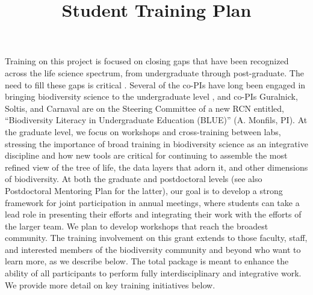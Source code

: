 \documentclass[11pt]{article}
\title{Student Training Plan \vspace{-1.5ex}}
\author{}
\date{}
\begin{document}
\maketitle
\thispagestyle{fancy} 
\vspace{-6em}


Training on this project is focused on closing gaps that have been
recognized across the life science spectrum, from undergraduate
through post-graduate.  The need to fill these gaps is critical
\citep{woodin2010}. Several of the co-PIs have long been engaged in
bringing biodiversity science to the undergraduate level
\citep[e.g.,][]{cook2014, lacey2017}, and co-PIs Guralnick, Soltis,
and Carnaval are on the Steering Committee of a new RCN entitled,
``Biodiversity Literacy in Undergraduate Education (BLUE)''
(A. Monfils, PI). At the graduate level, we focus on workshops and
cross-training between labs, stressing the importance of broad
training in biodiversity science as an integrative discipline and how
new tools are critical for continuing to assemble the most refined
view of the tree of life, the data layers that adorn it, and other
dimensions of biodiversity.  At both the graduate and postdoctoral
levels (see also Postdoctoral Mentoring Plan for the latter), our goal
is to develop a strong framework for joint participation in annual
meetings, where students can take a lead role in presenting their
efforts and integrating their work with the efforts of the larger
team.  We plan to develop workshops that reach the broadest community.
The training involvement on this grant extends to those faculty,
staff, and interested members of the biodiversity community and beyond
who want to learn more, as we describe below. The total package is
meant to enhance the ability of all participants to perform fully
interdisciplinary and integrative work.  We provide more detail on key
training initiatives below.
\end{document}
